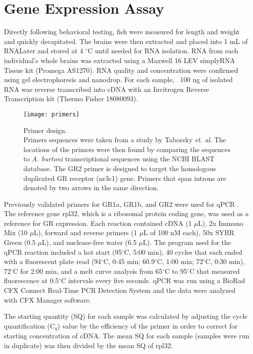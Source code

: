 \documentclass[12pt,twoside]{reedthesis}
\begin{document}
\section{Gene Expression Assay}
Directly following behavioral testing, fish were measured for length and weight
and quickly decapitated. The brains were then extracted and placed into 1 mL of
RNALater and
stored at 4 $^\circ$C until needed for RNA isolation. RNA from each individual's
whole brains was extracted
using a Maxwell 16 LEV simplyRNA Tissue kit (Promega AS1270). RNA quality and concentration were confirmed using gel
electrophoresis and nanodrop. For each sample, ~100 ng of isolated RNA was
reverse transcribed into cDNA with an Invitrogen Reverse Transcription kit
(Thermo Fisher 18080093).

\begin{figure}[htbp] 
\begin{centering} 
\texttt{[image: primers]}
\caption[Primer design]{\footnotesize{Primer design. \\ Primers sequences were taken
  from a study by Taborsky \textit{et. al}. The locations of the primers were then found by
  comparing the sequences to \textit{A. burtoni} transcriptional sequences using
the NCBI BLAST database. The GR2 primer is designed to target the homologous
duplicated GR receptor (nr3c1) gene. Primers that span introns are denoted by two arrows in
the same direction.}} 
\label{subd}
\end{centering} 
\end{figure}

Previously validated primers for GR1a, GR1b, and GR2 were used for qPCR \citep{solomon-lane_early-life_2018}. The
reference gene rpl32, which is a ribosomal protein coding gene, was used as a
reference for GR expression. Each reaction contained cDNA (1 $\mu$L), 2x Immuno Mix (10 $\mu$L),
forward and reverse primers (1 $\mu$L of 100 nM each), 50x SYBR Green (0.5
$\mu$L), and nuclease-free water (6.5 $\mu$L). The program used for the qPCR
reaction included a hot start (95$^\circ$C, 5:00 min), 40 cycles that each
ended with a fluorescent plate read (94$^\circ$C, 0:45 min; 60.9$^\circ$C, 1:00
min; 72$^\circ$C, 0:30 min), 72$^\circ$C for 2:00 min, and a melt curve analysis from 65$^\circ$C to
95$^\circ$C that measured fluorescence at 0.5$^\circ$C intervals every five
seconds. qPCR was run using a BioRad CFX Connect Real-Time PCR Detection System
and the data were analyzed with CFX Manager software.

The starting quantity (SQ) for each sample was calculated by adjusting the cycle
quantification (C$_{q}$)
value by the efficiency of the primer in order to
correct for starting concentration of cDNA. The 
mean SQ for each sample (samples were run in duplicate) was then divided by the mean SQ
of rpl32.
\end{document}
